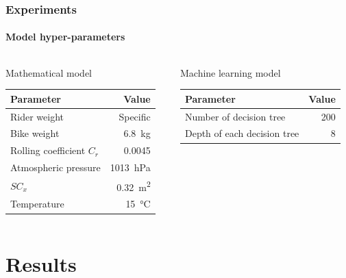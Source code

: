 \documentclass{beamer}
\begin{document}
\begin{frame}
  \frametitle{Experiments}
  \framesubtitle{Model hyper-parameters}
  \begin{columns}
    \begin{column}{0.5\textwidth}
      \begin{block}{\small Mathematical model}
        \begin{table}
          \centering
          \scriptsize
          \begin{tabular}{lr}
            \toprule
            \textbf{Parameter} & \textbf{Value} \\
            \midrule
            Rider weight & Specific \\
            Bike weight & \SI{6.8}{\kilo\gram} \\
            Rolling coefficient $C_{r}$ & 0.0045 \\
            Atmospheric pressure & \SI{1013}{\hecto\pascal} \\
            $S C_{x}$ & \SI{0.32}{\meter\squared} \\
            Temperature & \SI{15}{\celsius} \\
            \bottomrule
          \end{tabular}
        \end{table}
      \end{block}
    \end{column}
    \begin{column}{0.5\textwidth}  %
      \begin{block}{\small Machine learning model}
        \begin{table}
          \centering
          \scriptsize
          \begin{tabular}{lr}
            \toprule
            \textbf{Parameter} & \textbf{Value} \\
            \midrule
            Number of decision tree & 200 \\
            Depth of each decision tree & 8 \\
            \bottomrule
          \end{tabular}
        \end{table}
      \end{block}
    \end{column}
  \end{columns}
\end{frame}

\section{Results}
\end{document}
